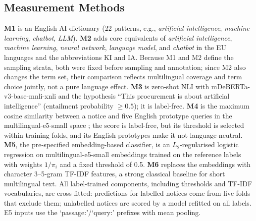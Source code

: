 \documentclass[runningheads]{llncs}
\begin{document}
\subsection{Measurement Methods}
\textbf{M1} is an English AI dictionary (22 patterns, e.g., \textit{artificial intelligence}, \textit{machine learning}, \textit{chatbot}, \textit{LLM}). \textbf{M2} adds core equivalents of \textit{artificial intelligence}, \textit{machine learning}, \textit{neural network}, \textit{language model}, and \textit{chatbot} in the EU languages and the abbreviations KI and IA. Because M1 and M2 define the sampling strata, both were fixed before sampling and annotation; since M2 also changes the term set, their comparison reflects multilingual coverage and term choice jointly, not a pure language effect. \textbf{M3} is zero-shot NLI with mDeBERTa-v3-base-mnli-xnli \cite{he2023,yin2019} and the hypothesis ``This procurement is about artificial intelligence'' (entailment probability $\ge 0.5$); it is label-free. \textbf{M4} is the maximum cosine similarity between a notice and five English prototype queries in the multilingual-e5-small space \cite{wang2024me5}; the score is label-free, but its threshold is selected within training folds, and its English prototypes make it not language-neutral. \textbf{M5}, the pre-specified embedding-based classifier, is an $L_2$-regularised logistic regression on multilingual-e5-small embeddings trained on the reference labels with weights $1/\pi_i$ and a fixed threshold of 0.5. \textbf{M6} replaces the embeddings with character 3--5-gram TF-IDF features, a strong classical baseline for short multilingual text. All label-trained components, including thresholds and TF-IDF vocabularies, are cross-fitted: predictions for labelled notices come from five folds that exclude them; unlabelled notices are scored by a model refitted on all labels. E5 inputs use the `passage:'/`query:' prefixes with mean pooling.
\end{document}
